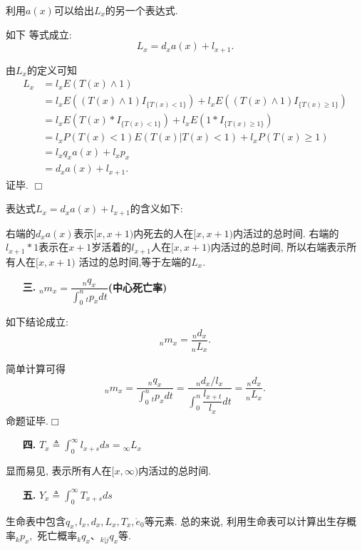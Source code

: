 \documentclass[a4paper,10pt]{ctexbook}
\newcommand{\hei}{\CJKfamily{hei}}      %
\def\qed{\hfill$\Box$\medskip}
\begin{document}
利用$a(x)$可以给出$L_x$的另一个表达式.
\begin{proposition}如下
    等式成立: $$L_x=d_xa(x)+l_{x+1}.$$
\end{proposition}
\proof 由$L_x$的定义可知
\begin{align*}
    L_x & =l_xE(T(x)\wedge1)                                                       \\
        & =l_xE((T(x)\wedge1)I_{\{T(x)<1\}})+l_xE((T(x)\wedge 1)I_{\{T(x)\ge 1\}}) \\
        & =l_xE(T(x)*I_{\{T(x)<1\}})+l_xE(1*I_{\{T(x)\ge 1\}})                     \\
        & =l_xP(T(x)<1)E(T(x)|T(x)<1)+l_xP(T(x)\ge 1)                              \\
        & =l_xq_xa(x)+l_xp_x                                                       \\
        & =d_xa(x)+l_{x+1}.
\end{align*}
证毕. \qed

表达式$L_x=d_xa(x)+l_{x+1}$的含义如下:

\noindent 右端的$d_xa(x)$表示$[x,x+1)$内死去的人在$[x,x+1)$内活过的总时间. 右端的$l_{x+1}*1$表示在$x+1$岁活着的$l_{x+1}$人在$[x,x+1)$内活过的总时间, 所以右端表示所有人在$[x,x+1)$ 活过的总时间,等于左端的$L_x.$
\begin{itemize}
    \item[{\bf\hei 三.}]{\bf\hei ${}_nm_x=\dfrac {{}_nq_x}{\int_0^n{}_tp_xdt}$(中心死亡率)}
\end{itemize}


\begin{proposition}如下结论成立:
    $${}_nm_x=\dfrac{{}_nd_x}{{}_nL_x}.$$
\end{proposition}
\proof 简单计算可得
$${}_nm_x=\dfrac{{}_nq_x}{\int_0^n{}_tp_xdt}=\dfrac{{}_nd_x/l_x}{\int_0^n\dfrac{l_{x+t}}{l_x}dt}=
    \dfrac{{}_nd_x}{{}_nL_x}.$$命题证毕.\qed

\begin{itemize}
    \item[{\bf\hei 四.}]{\bf\hei $T_x\triangleq\int_0^{\infty}l_{x+s}ds={}_{\infty}L_x$}
\end{itemize}
显而易见, 表示所有人在$[x,\infty)$内活过的总时间.

\begin{itemize}
    \item[{\bf\hei 五.}]{\bf\hei $Y_x\triangleq\int_0^{\infty}T_{x+s}ds$}
\end{itemize}

生命表中包含$q_x,l_x,d_x,L_x,T_x,\mathring{e}_0$等元素. 总的来说, 利用生命表可以计算出生存概率${}_kp_x,$ 死亡概率${}_kq_x$、${}_{k|j}q_x$等.
\newpage
\end{document}
